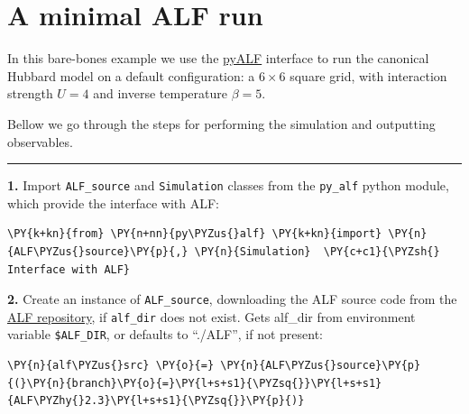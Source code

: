     
    

    
    \hypertarget{a-minimal-alf-run}{%
\section{A minimal ALF run}\label{a-minimal-alf-run}}

    In this bare-bones example we use the
\href{https://git.physik.uni-wuerzburg.de/ALF/pyALF/-/tree/ALF-2.3/}{pyALF}
interface to run the canonical Hubbard model on a default configuration:
a \(6\times6\) square grid, with interaction strength \(U=4\) and
inverse temperature \(\beta = 5\).

Bellow we go through the steps for performing the simulation and
outputting observables.

\begin{center}\rule{0.5\linewidth}{0.5pt}\end{center}

\textbf{1.} Import \texttt{ALF\_source} and \texttt{Simulation} classes
from the \texttt{py\_alf} python module, which provide the interface
with ALF:

    \begin{tcolorbox}[breakable, size=fbox, boxrule=1pt, pad at break*=1mm,colback=cellbackground, colframe=cellborder]
\begin{Verbatim}[commandchars=\\\{\}]
\PY{k+kn}{from} \PY{n+nn}{py\PYZus{}alf} \PY{k+kn}{import} \PY{n}{ALF\PYZus{}source}\PY{p}{,} \PY{n}{Simulation}  \PY{c+c1}{\PYZsh{} Interface with ALF}
\end{Verbatim}
\end{tcolorbox}

    \textbf{2.} Create an instance of \texttt{ALF\_source}, downloading the
ALF source code from the
\href{https://git.physik.uni-wuerzburg.de/ALF/ALF/-/tree/master/}{ALF
repository}, if \texttt{alf\_dir} does not exist. Gets alf\_dir from
environment variable \texttt{\$ALF\_DIR}, or defaults to ``./ALF'', if
not present:

    \begin{tcolorbox}[breakable, size=fbox, boxrule=1pt, pad at break*=1mm,colback=cellbackground, colframe=cellborder]
\begin{Verbatim}[commandchars=\\\{\}]
\PY{n}{alf\PYZus{}src} \PY{o}{=} \PY{n}{ALF\PYZus{}source}\PY{p}{(}\PY{n}{branch}\PY{o}{=}\PY{l+s+s1}{\PYZsq{}}\PY{l+s+s1}{ALF\PYZhy{}2.3}\PY{l+s+s1}{\PYZsq{}}\PY{p}{)}
\end{Verbatim}
\end{tcolorbox}

